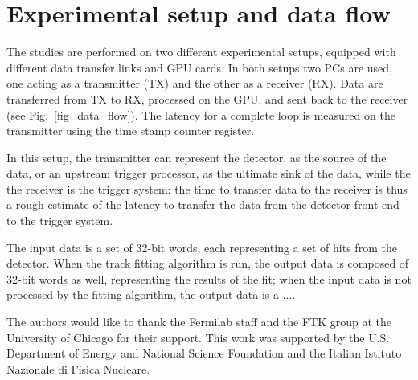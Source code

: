 \documentclass[letterpaper]{jpconf}
\begin{document}
\section{Experimental setup and data flow}
The studies are performed on two different experimental setups,
equipped with different data transfer links and GPU cards.  In both
setups two PCs are used, one acting as a transmitter (TX) and the
other as a receiver (RX).  Data are transferred from TX to RX,
processed on the GPU, and sent back to the receiver (see
Fig.~\ref{fig_data_flow}).  The latency for a complete loop is
measured on the transmitter using the time stamp counter register.

In this setup, the transmitter can represent the detector, as
the source of the data, or an upstream trigger processor, as
the ultimate sink of the data, while the the receiver is the
trigger system: the time to transfer data to the receiver is thus a
rough estimate of the latency to transfer the data from the detector
front-end to the trigger system.
 
The input data is a set of 32-bit words, each representing a set of
hits from the detector. When the track fitting algorithm is run, the
output data is composed of 32-bit words as well, representing the
results of the fit; when the input data is not processed by the
fitting algorithm, the output data is a .... 


\ack
The authors would like to thank the Fermilab staff and the FTK group at the 
University of Chicago for their support. This work was supported by the
U.S. Department of Energy and National Science Foundation and the Italian
Istituto Nazionale di Fisica Nucleare. 






 
\end{document}

